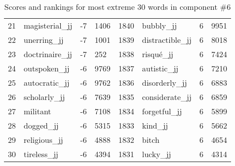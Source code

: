 \begin{table}[tbp]
\begin{tabular}{| rlr@{.}l | rlr@{.}l |}
    21 & magisterial\_jj & -7 & 1406    &    1840 & bubbly\_jj & 6 & 9951 \\
    22 & unerring\_jj & -7 & 1001    &    1839 & distractible\_jj & 6 & 8018 \\
    23 & doctrinaire\_jj & -7 & 252    &    1838 & risqué\_jj & 6 & 7424 \\
    24 & outspoken\_jj & -6 & 9769    &    1837 & autistic\_jj & 6 & 7210 \\
    25 & autocratic\_jj & -6 & 9762    &    1836 & disorderly\_jj & 6 & 6883 \\
    26 & scholarly\_jj & -6 & 7639    &    1835 & considerate\_jj & 6 & 6859 \\
    27 & militant & -6 & 7108    &    1834 & forgetful\_jj & 6 & 5899 \\
    28 & dogged\_jj & -6 & 5315    &    1833 & kind\_jj & 6 & 5662 \\
    29 & religious\_jj & -6 & 4888    &    1832 & bitch & 6 & 4654 \\
    30 & tireless\_jj & -6 & 4394    &    1831 & lucky\_jj & 6 & 4314 \\
    \hline
    \end{tabular}
    \caption{Scores and rankings for most extreme 30 words in component \#6} 
\end{table}
\clearpage

